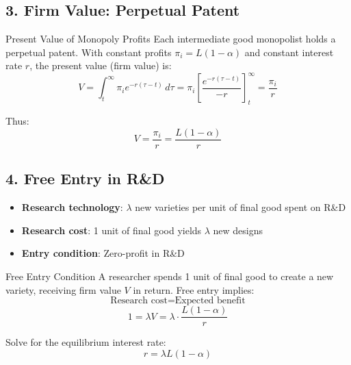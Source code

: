 \documentclass[a4paper,11pt]{article}
\begin{document}
\subsection*{3. Firm Value: Perpetual Patent}

\bigskip
\begin{derivationbox}{Present Value of Monopoly Profits}
Each intermediate good monopolist holds a perpetual patent. With constant profits $\pi_i = L(1-\alpha)$ and constant interest rate $r$, the present value (firm value) is:
\[
V = \int_t^\infty \pi_i e^{-r(\tau-t)} \, d\tau = \pi_i \left[\frac{e^{-r(\tau-t)}}{-r}\right]_t^\infty = \frac{\pi_i}{r}
\]

Thus:
\[
\boxed{V = \frac{\pi_i}{r} = \frac{L(1-\alpha)}{r}}
\tag{Firm Value}
\]
\end{derivationbox}

\subsection*{4. Free Entry in R\&D}

\bigskip
\begin{tcolorbox}[colback=yellow!10,colframe=yellow!60,title=R\&D Sector]
\begin{itemize}
    \item \textbf{Research technology}: $\lambda$ new varieties per unit of final good spent on R\&D
    \item \textbf{Research cost}: 1 unit of final good yields $\lambda$ new designs
    \item \textbf{Entry condition}: Zero-profit in R\&D
\end{itemize}
\end{tcolorbox}

\medskip
\begin{derivationbox}{Free Entry Condition}
A researcher spends 1 unit of final good to create a new variety, receiving firm value $V$ in return. Free entry implies:
\[
\text{Research cost} = \text{Expected benefit}
\]
\[
1 = \lambda V = \lambda \cdot \frac{L(1-\alpha)}{r}
\]

Solve for the equilibrium interest rate:
\[
\boxed{r = \lambda L (1-\alpha)}
\tag{Interest Rate}
\]
\end{derivationbox}
\end{document}
